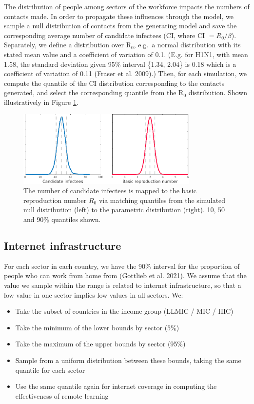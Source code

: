 \documentclass[
]{article}
\providecommand{\tightlist}{%
  \setlength{\itemsep}{0pt}\setlength{\parskip}{0pt}}
\begin{document}
The distribution of people among sectors of the workforce impacts the numbers of contacts made. In order to propagate these influences through the model, we sample a null distribution of contacts from the generating model and save the corresponding average number of candidate infectees (CI, where CI \(=R_0/\beta\)). Separately, we define a distribution over R\(_0\), e.g.~a normal distribution with its stated mean value and a coefficient of variation of 0.1. (E.g. for H1N1, with mean 1.58, the standard deviation given 95\% interval \{1.34, 2.04\} is 0.18 which is a coefficient of variation of 0.11 (Fraser et al. 2009).) Then, for each simulation, we compute the quantile of the CI distribution corresponding to the contacts generated, and select the corresponding quantile from the R\(_0\) distribution. Shown illustratively in Figure \ref{fig:candidateinfectees}.

\begin{figure}
\centering
\includegraphics[width=0.8\textwidth,height=\textheight]{candidateinfectees.png}
\caption{\label{fig:candidateinfectees} The number of candidate infectees is mapped to the basic reproduction number \(R_0\) via matching quantiles from the simulated null distribution (left) to the parametric distribution (right). 10, 50 and 90\% quantiles shown.}
\end{figure}

\newpage

\hypertarget{internet-infrastructure}{%
\subsection{Internet infrastructure}\label{internet-infrastructure}}

For each sector in each country, we have the 90\% interval for the proportion of people who can work from home from (Gottlieb et al. 2021). We assume that the value we sample within the range is related to internet infrastructure, so that a low value in one sector implies low values in all sectors. We:

\begin{itemize}
\tightlist
\item
  Take the subset of countries in the income group (LLMIC / MIC / HIC)
\item
  Take the minimum of the lower bounds by sector (5\%)
\item
  Take the maximum of the upper bounds by sector (95\%)
\item
  Sample from a uniform distribution between these bounds, taking the same quantile for each sector
\item
  Use the same quantile again for internet coverage in computing the effectiveness of remote learning
\end{itemize}
\end{document}
